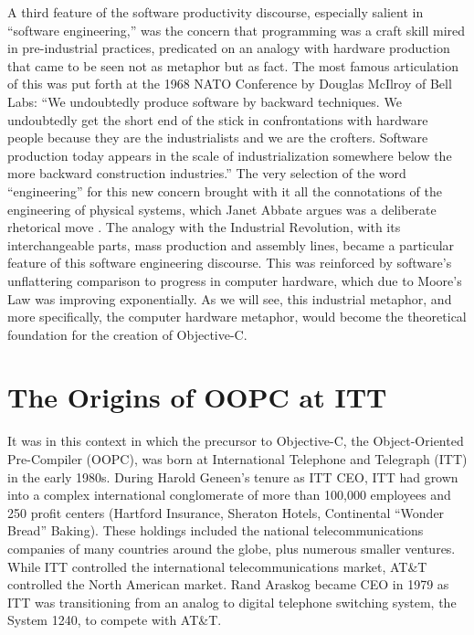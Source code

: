 \documentclass[acmsmall,screen]{acmart}
\begin{document}
A third feature of the software productivity discourse, especially salient in ``software engineering,'' was the concern that programming was a craft skill mired in pre-industrial practices, predicated on an analogy with hardware production that came to be seen not as metaphor but as fact. The most famous articulation of this was put forth at the 1968 NATO Conference by Douglas McIlroy of Bell Labs: ``We undoubtedly produce software by backward techniques. We undoubtedly get the short end of the stick in confrontations with hardware people because they are the industrialists and we are the crofters. Software production today appears in the scale of industrialization somewhere below the more backward construction industries.'' \citep[11]{mahoney_finding_2004} The very selection of the word ``engineering'' for this new concern brought with it all the connotations of the engineering of physical systems, which Janet Abbate argues was a deliberate rhetorical move \citep[97--105]{abbate_software_2012}. The analogy with the Industrial Revolution, with its interchangeable parts, mass production and assembly lines, became a particular feature of this software engineering discourse. This was reinforced by software's unflattering comparison to progress in computer hardware, which due to Moore's Law was improving exponentially. As we will see, this industrial metaphor, and more specifically, the computer hardware metaphor, would become the theoretical foundation for the creation of Objective-C. 

\section{The Origins of OOPC at ITT}
\label{sec-OOPC@ITT}
It was in this context in which the precursor to Objective-C, the Object-Oriented Pre-Compiler (OOPC), was born at International Telephone and Telegraph (ITT) in the early 1980s. During Harold Geneen's tenure as ITT CEO, ITT had grown into a complex international conglomerate of more than 100,000 employees and 250 profit centers (Hartford Insurance, Sheraton Hotels, Continental ``Wonder Bread'' Baking). These holdings included the national telecommunications companies of many countries around the globe, plus numerous smaller ventures. While ITT controlled the international telecommunications market, AT\&T controlled the North American market. Rand Araskog became CEO in 1979 as ITT was transitioning from an analog to digital telephone switching system, the System 1240, to compete with AT\&T.
\end{document}
